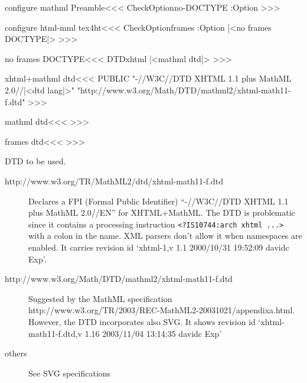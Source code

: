 \<configure mathml Preamble\><<<  
\:CheckOption{no-DOCTYPE} \if:Option
\fi
>>>



\<configure html-mml tex4ht\><<<
\:CheckOption{frames}  \if:Option 
   \else       
      |<no frames DOCTYPE|>
\fi
>>>



\<no frames DOCTYPE\><<<
\def\:temp{xhtml}
\ifx \:DTD\:temp
   |<mathml dtd|>
\fi
>>>

% 

\<xhtml+mathml dtd\><<<
PUBLIC
     "-//W3C//DTD XHTML 1.1 plus MathML 2.0//|<dtd lang|>"\Hnewline
     "http://www.w3.org/Math/DTD/mathml2/xhtml-math11-f.dtd"
>>>

\<mathml dtd\><<<
>>>

\<frames dtd\><<<
   {}
>>>





DTD to be used.

\begin{description}



\item [http://www.w3.org/TR/MathML2/dtd/xhtml-math11-f.dtd]

Declares a  FPI (Formal Public Identifier)
``-//W3C//DTD XHTML 1.1 plus MathML 2.0//EN'' for XHTML+MathML. 
The DTD is problematic
since it contains a processing instruction
\verb!<?IS10744:arch xhtml ...>!  with a colon in the name. XML 
parsers don't allow it when namespaces are enabled. It carries 
revision id `xhtml-1,v 1.1 2000/10/31 19:52:09 davidc Exp'.

\item[http://www.w3.org/Math/DTD/mathml2/xhtml-math11-f.dtd]

Suggested by the MathML 
specification
 http://www.w3.org/TR/2003/REC-MathML2-20031021/appendixa.html.  However, the
DTD incorporates also SVG.  It shows revision id
`xhtml-math11-f.dtd,v 1.16 2003/11/04 13:14:35 davidc Exp'

\item [others]

See SVG specifications
\end{description}

